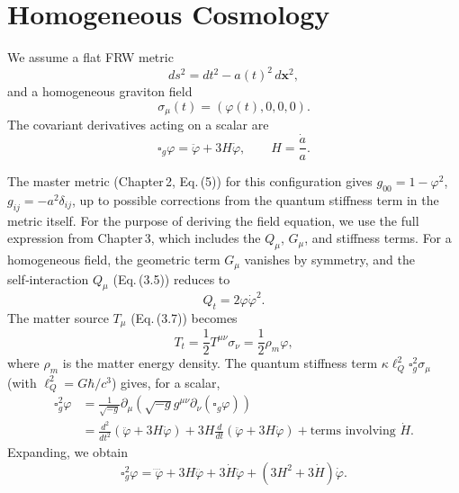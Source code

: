 \documentclass[11pt,a4paper]{article}
\begin{document}
\section{Homogeneous Cosmology}
\label{sec:cosmo}

We assume a flat FRW metric
\begin{equation}
ds^2 = dt^2 - a(t)^2 \, d\mathbf{x}^2,
\end{equation}
and a homogeneous graviton field
\begin{equation}
\sigma_\mu(t) = (\varphi(t), 0,0,0).
\end{equation}
The covariant derivatives acting on a scalar are
\begin{equation}
\square_g \varphi = \ddot\varphi + 3H\dot\varphi, \qquad H = \frac{\dot a}{a}.
\end{equation}

The master metric (Chapter 2, Eq. (5)) for this configuration gives \(g_{00} = 1 - \varphi^2\), \(g_{ij} = -a^2\delta_{ij}\), up to possible corrections from the quantum stiffness term in the metric itself. For the purpose of deriving the field equation, we use the full expression from Chapter 3, which includes the \(Q_\mu\), \(G_\mu\), and stiffness terms. For a homogeneous field, the geometric term \(G_\mu\) vanishes by symmetry, and the self‑interaction \(Q_\mu\) (Eq. (3.5)) reduces to
\begin{equation}
Q_t = 2\varphi \dot\varphi^2.
\end{equation}
The matter source \(T_\mu\) (Eq. (3.7)) becomes
\begin{equation}
T_t = \frac{1}{2} T^{\mu\nu} \sigma_\nu = \frac{1}{2} \rho_m \varphi,
\end{equation}
where \(\rho_m\) is the matter energy density. The quantum stiffness term \(\kappa\ell_Q^2\square_g^2\sigma_\mu\) (with \(\ell_Q^2 = G\hbar/c^3\)) gives, for a scalar,
\begin{align}
\square_g^2 \varphi &= \frac{1}{\sqrt{-g}} \partial_\mu \left( \sqrt{-g} g^{\mu\nu} \partial_\nu (\square_g \varphi) \right) \\
&= \frac{d^2}{dt^2} (\ddot\varphi + 3H\dot\varphi) + 3H \frac{d}{dt} (\ddot\varphi + 3H\dot\varphi) + \text{terms involving } \dot H.
\end{align}
Expanding, we obtain
\begin{equation}
\square_g^2 \varphi = \ddddot\varphi + 3H \dddot\varphi + 3\dot H \ddot\varphi + (3H^2 + 3\dot H) \dot\varphi. \tag{1}
\end{equation}
\end{document}
